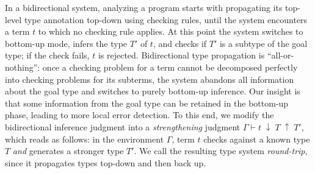 \documentclass[10pt,preprint]{sigplanconf-pldi16}
\theoremstyle{definition}
\newcommand{\env}{\Gamma}
\newcommand{\produce}{\;\uparrow\;}
\newcommand{\consume}{\;\downarrow\;}
\begin{document}
In a bidirectional system, analyzing a program starts with propagating its top-level type annotation top-down using checking rules,
until the system encounters a term $t$ to which no checking rule applies.
At this point the system switches to bottom-up mode, infers the type $T'$ of $t$,
and checks if $T'$ is a subtype of the goal type;
if the check fails, $t$ is rejected.
Bidirectional type propagation is ``all-or-nothing'':
once a checking problem for a term cannot be decomposed perfectly into checking problems for its subterms,
the system abandons all information about the goal type and switches to purely bottom-up inference.
Our insight is that some information from the goal type can be retained in the bottom-up phase,
leading to more local error detection.
To this end, we modify the bidirectional inference judgment into a \emph{strengthening} judgment $\env \vdash t \consume T \produce T'$,
which reads as follows: 
in the environment $\env$, term $t$ checks against a known type $T$ \emph{and} generates a stronger type $T'$.
We call the resulting type system \emph{round-trip},
since it propagates types top-down and then back up.
\end{document}
